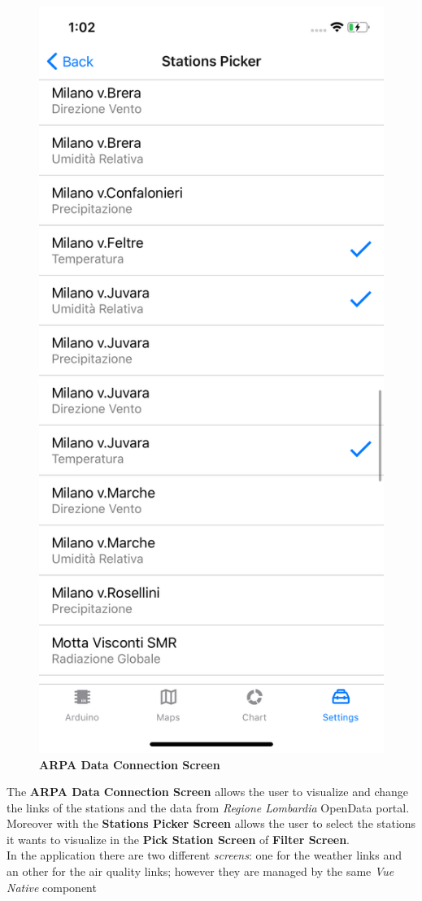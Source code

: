 \begin{figure}[H]
\includegraphics[height=.6\textheight]{./img/ui/stations_picker.png}
\caption{\textbf{ARPA Data Connection Screen}}
\end{figure}
\begin{center}
The \textbf{ARPA Data Connection Screen} allows the user to visualize and change the links of the stations and the data from \textit{Regione Lombardia} OpenData portal.\\ Moreover with the \textbf{Stations Picker Screen} allows the user to select the stations it wants to visualize in the \textbf{Pick Station Screen} of \textbf{Filter Screen}.\\
In the application there are two different \textit{screens}: one for the weather links and an other for the air quality links; however they are managed by the same \textit{Vue Native} component
\end{center}